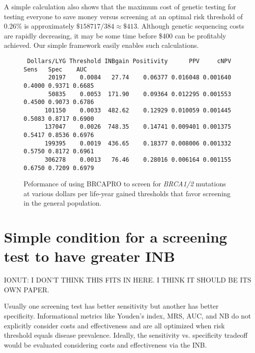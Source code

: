 \documentclass[11pt, letterpaper]{article}
\begin{document}
A simple calculation also shows that the maximum cost of genetic testing for testing everyone to save money versus screening at an optimal risk threshold of 0.26\% is approximately $\$158717/384\approx \$413$.  Although genetic sequencing costs are rapidly decreasing, it may be some time before \$400 can be profitably achieved.  Our simple framework easily enables such calculations. 

\begin{figure}[t!]
	\centering
	\begin{verbatim}
 Dollars/LYG Threshold INBgain Positivity      PPV     cNPV   Sens   Spec    AUC
       20197    0.0084   27.74    0.06377 0.016048 0.001640 0.4000 0.9371 0.6685
       50835    0.0053  171.90    0.09364 0.012295 0.001553 0.4500 0.9073 0.6786
      101150    0.0033  482.62    0.12929 0.010059 0.001445 0.5083 0.8717 0.6900
      137047    0.0026  748.35    0.14741 0.009401 0.001375 0.5417 0.8536 0.6976
      199395    0.0019  436.65    0.18377 0.008006 0.001332 0.5750 0.8172 0.6961
      306278    0.0013   76.46    0.28016 0.006164 0.001155 0.6750 0.7209 0.6979
	\end{verbatim}
	\caption{Peformance of using BRCAPRO to screen for \textit{BRCA1/2} mutations at various dollars per life-year gained thresholds that favor screening in the general population.}
\label{tab:dollarsperLYG}
\end{figure}


\section{Simple condition for a screening test to have greater INB}
\label{sec:moreINB}


IONUT:  I DON'T THINK THIS FITS IN HERE.  I THINK IT SHOULD BE ITS OWN PAPER.

Usually one screening test has better sensitivity but another has better specificity.  Informational metrics like Youden's index, MRS, AUC, and NB do not explicitly consider costs and effectiveness and are all optimized when risk threshold equals disease prevalence.  Ideally, the sensitivity vs. specificity tradeoff would be evaluated considering costs and effectiveness via the INB.
\end{document}
